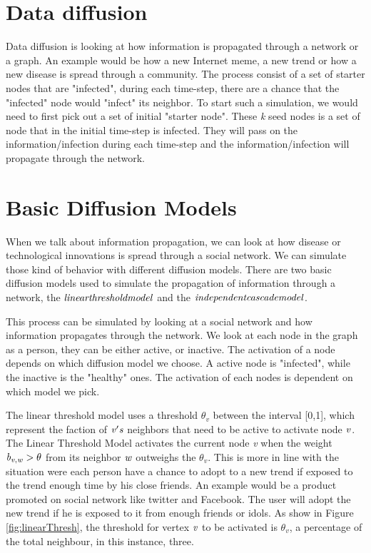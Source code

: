 \section{Data diffusion}
Data diffusion is looking at how information is propagated through a network or a graph. An example would be how a new Internet meme, a new trend or how a new disease is spread through a community. The process consist of a set of starter nodes that are "infected", during each time-step, there are a chance that the "infected" node would "infect" its neighbor. To start such a simulation, we would need to first pick out a set of initial "starter node". These {\it k} seed nodes is a set of node that in the initial time-step is infected. They will pass on the information/infection during each time-step and the information/infection will propagate through the network.

\section{Basic Diffusion Models}
When we talk about information propagation, we can look at how disease or technological innovations is spread through a social network. We can simulate those kind of behavior with different diffusion models. There are two basic diffusion models used to simulate the propagation of information through a network\cite{MaximizeSpread2003}, the {$\it linear threshold model$} and the $\it{ independent cascade model}$\cite{MaximizeSpread2003}.

This process can be simulated by looking at a social network and how information propagates through the network. We look at each node in the graph as a person, they can be either active, or inactive. The activation of a node depends on which diffusion model we choose. A active node is "infected", while the inactive is the "healthy" ones. The activation of each nodes is dependent on which model we pick.

The linear threshold model uses a threshold $\theta_v$ between the interval [0,1], which represent the faction of $\it{v}'s$ neighbors that need to be active to activate node $\it{v}$. The Linear Threshold Model activates the current node {\it v} when the weight ${\it b_{v,w}} > \theta$ from its neighbor $\it{w}$ outweighs the $\theta_v$. This is more in line with the situation were each person have a chance to adopt to a new trend if exposed to the trend enough time by his close friends. An example would be a product promoted on social network like twitter and Facebook. The user will adopt the new trend if he is exposed to it from enough friends or idols. As show in Figure \ref{fig:linearThresh}, the threshold for vertex $\it{v}$ to be activated is $\theta_v$, a percentage of the total neighbour, in this instance, three.

